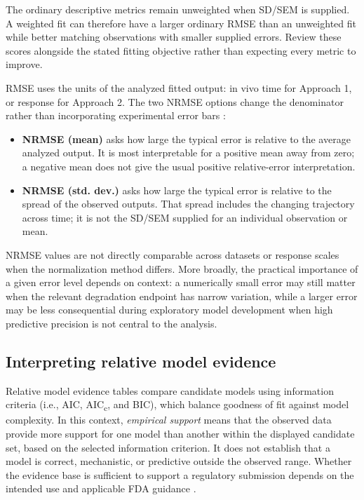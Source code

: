 The ordinary descriptive metrics remain unweighted when SD/SEM is supplied. A weighted fit can therefore have a larger ordinary RMSE than an unweighted fit while better matching observations with smaller supplied errors. Review these scores alongside the stated fitting objective rather than expecting every metric to improve.

RMSE uses the units of the analyzed fitted output: in vivo time for Approach 1, or response for Approach 2. The two NRMSE options change the denominator rather than incorporating experimental error bars \cite{hyndman2006}:

\begin{itemize}
    \item \textbf{NRMSE (mean)} asks how large the typical error is relative to the average analyzed output. It is most interpretable for a positive mean away from zero; a negative mean does not give the usual positive relative-error interpretation.
    \item \textbf{NRMSE (std. dev.)} asks how large the typical error is relative to the spread of the observed outputs. That spread includes the changing trajectory across time; it is not the SD/SEM supplied for an individual observation or mean.
\end{itemize}

NRMSE values are not directly comparable across datasets or response scales when the normalization method differs. More broadly, the practical importance of a given error level depends on context: a numerically small error may still matter when the relevant degradation endpoint has narrow variation, while a larger error may be less consequential during exploratory model development when high predictive precision is not central to the analysis.


\subsection{Interpreting relative model evidence}
\label{app:information-criteria}

Relative model evidence tables compare candidate models using information criteria (i.e., AIC, AIC\textsubscript{c}, and BIC), which balance goodness of fit against model complexity. In this context, \textit{empirical support} means that the observed data provide more support for one model than another within the displayed candidate set, based on the selected information criterion. It does not establish that a model is correct, mechanistic, or predictive outside the observed range. Whether the evidence base is sufficient to support a regulatory submission depends on the intended use and applicable FDA guidance \cite{fda_modeling_guidance,fda_reporting_guidance}.

